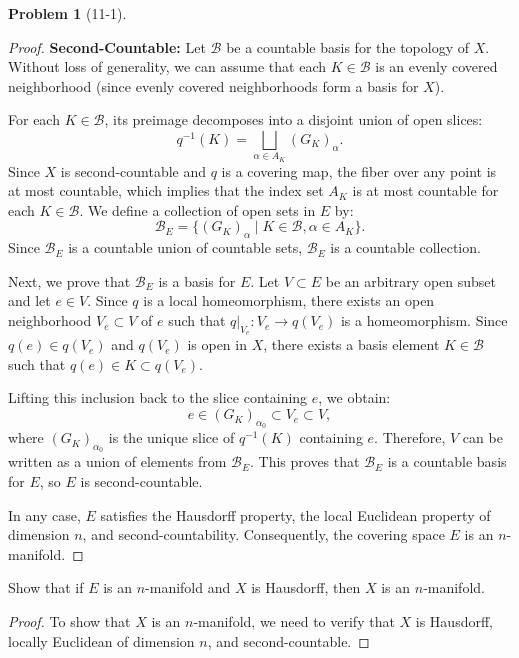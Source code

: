 \documentclass[11pt, a4paper]{article}
\theoremstyle{definition}
\newtheorem{prob}{Problem}
\newenvironment{problem}[1][]{\begin{prob}[#1]\normalfont}{\end{prob}\vspace{1.5em}}
\begin{document}
\begin{problem}[11-1]
\begin{enumerate}[(a)]
\begin{proof}
        \item[$3^\circ$] \textbf{Second-Countable:} 
        Let $\mathcal{B}$ be a countable basis for the topology of $X$. Without loss of generality, we can assume that each $K \in \mathcal{B}$ is an evenly covered neighborhood (since evenly covered neighborhoods form a basis for $X$). 
        
        For each $K \in \mathcal{B}$, its preimage decomposes into a disjoint union of open slices:
        \[
        q^{-1}(K) = \bigsqcup_{\alpha \in A_K} (G_K)_\alpha.
        \]
        Since $X$ is second-countable and $q$ is a covering map, the fiber over any point is at most countable, which implies that the index set $A_K$ is at most countable for each $K \in \mathcal{B}$. We define a collection of open sets in $E$ by:
        \[
        \mathcal{B}_E = \{ (G_K)_\alpha \mid K \in \mathcal{B}, \alpha \in A_K \}.
        \]
        Since $\mathcal{B}_E$ is a countable union of countable sets, $\mathcal{B}_E$ is a countable collection.
        
        Next, we prove that $\mathcal{B}_E$ is a basis for $E$. Let $V \subset E$ be an arbitrary open subset and let $e \in V$. Since $q$ is a local homeomorphism, there exists an open neighborhood $V_e \subset V$ of $e$ such that $q|_{V_e}: V_e \to q(V_e)$ is a homeomorphism. Since $q(e) \in q(V_e)$ and $q(V_e)$ is open in $X$, there exists a basis element $K \in \mathcal{B}$ such that $q(e) \in K \subset q(V_e)$. 
        
        Lifting this inclusion back to the slice containing $e$, we obtain:
        \[
        e \in (G_K)_{\alpha_0} \subset V_e \subset V,
        \]
        where $(G_K)_{\alpha_0}$ is the unique slice of $q^{-1}(K)$ containing $e$. Therefore, $V$ can be written as a union of elements from $\mathcal{B}_E$. This proves that $\mathcal{B}_E$ is a countable basis for $E$, so $E$ is second-countable.

    \medskip
    In any case, $E$ satisfies the Hausdorff property, the local Euclidean property of dimension $n$, and second-countability. Consequently, the covering space $E$ is an $n$-manifold.
    \end{proof}

    \vspace{2em} %
    \item Show that if $E$ is an $n$-manifold and $X$ is Hausdorff, then $X$ is an $n$-manifold.
    
    \begin{proof}
    To show that $X$ is an $n$-manifold, we need to verify that $X$ is Hausdorff, locally Euclidean of dimension $n$, and second-countable.


\end{proof}
\end{enumerate}
\end{problem}
\end{document}

